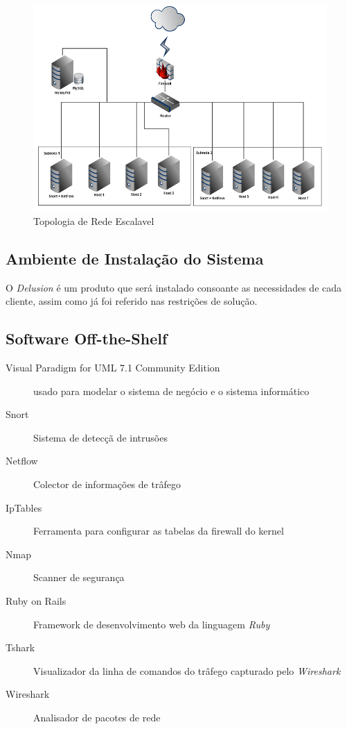 \begin{figure}
	\centering	
	\includegraphics[scale=0.6]{images/topologia3.png}
	\caption{Topologia de Rede Escalavel}
    \label{img:topo2}
\end{figure}


\subsection{Ambiente de Instalação do Sistema}

    O \textit{Delusion} é um produto que será instalado consoante as necessidades de cada cliente, assim como já foi referido nas restrições de solução.

\subsection{Software Off-the-Shelf}
\begin{description}
    \item [Visual Paradigm for UML 7.1 Community Edition] usado para modelar o sistema de negócio e o sistema informático
    \item [Snort] Sistema de detecçã de intrusões
    \item [Netflow] Colector de informações de trâfego
    \item [IpTables] Ferramenta para configurar as tabelas da firewall do kernel
    \item [Nmap] Scanner de segurança
    \item [Ruby on Rails] Framework de desenvolvimento web da linguagem \textit{Ruby}
    \item [Tshark] Visualizador da linha de comandos do trâfego capturado pelo \textit{Wireshark}
    \item [Wireshark] Analisador de pacotes de rede
\end{description}

